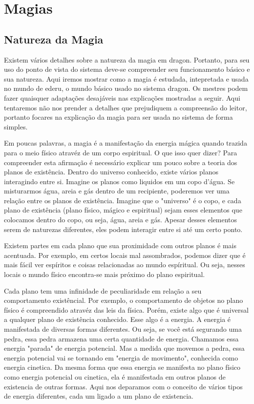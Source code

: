 
\chapter{Magias}
\label{Cap:Magias}


\section{Natureza da Magia}

Existem vários detalhes sobre a natureza da magia em dragon. Portanto, para seu uso do ponto de vista do sistema deve-se compreender seu funcionamento básico e sua natureza. Aqui iremos mostrar como a magia é estudada, intepretada e usada no mundo de ederu, o mundo básico usado no sistema dragon. Os mestres podem fazer quaisquer adaptações desajáveis nas explicações mostradas a seguir. Aqui tentaremos não nos prender a detalhes que prejudiquem a compreensão do leitor, portanto focares na explicação da magia para ser usada no sistema de forma simples.

Em poucas palavras, a magia é a manifestação da energia mágica quando trazida para o meio físico atravéz de um corpo espiritual. O que isso quer dizer? Para compreender esta afirmação é necessário explicar um pouco sobre a teoria dos planos de existência. Dentro do universo conhecido, existe vários planos interagindo entre si. Imagine os planos como liquidos em um copo d'água. Se misturarmos água, areia e gás dentro de um recipiente, poderemos ver uma relação entre os planos de existência. Imagine que o "universo" é o copo, e cada plano de existência (plano físico, mágico e espiritual) sejam esses elementos que colocamos dentro do copo, ou seja, água, areia e gás. Apesar desses elementos serem de naturezas diferentes, eles podem interagir entre si até um certo ponto.

Existem partes em cada plano que sua proximidade com outros planos é mais acentuada. Por exemplo, em certos locais mal assombrados, podemos dizer que é mais fácil ver espíritos e coisas relacionadas ao mundo espíritual. Ou seja, nesses locais o mundo físico encontra-se  mais próximo do plano espiritual.

Cada plano tem uma infinidade de peculiaridade em relação a seu comportamento existêncial. Por exemplo, o comportamento de objetos no plano físico é compreendido atravéz das leis da física. Porém, existe algo que é universal a qualquer plano de existência conhecido. Esse algo é a energia. A energia é manifestada de diversas formas diferentes. Ou seja, se você está segurando uma pedra, essa pedra armazena uma certa quantidade de energia. Chamamos essa energia "parada" de energia potencial. Mas a medida que movemos a pedra, essa energia potencial vai se tornando em "energia de movimento", conhecida como energia cinetica. Da mesma forma que essa energia se manifesta no plano físico como energia potencial ou cinetica, ela é manifestada em outros planos de existencia de outras formas. Aqui nos deparamos com o conceito de vários tipos de energia diferentes, cada um ligado a um plano de existencia.

